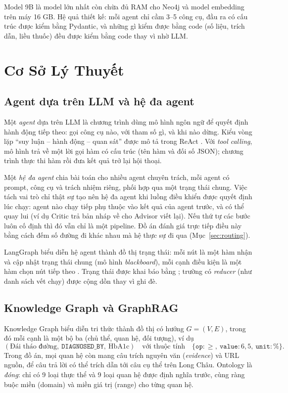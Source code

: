 \documentclass[12pt,a4paper]{report}
\newcommand{\codeinline}[1]{\texttt{\detokenize{#1}}}
\begin{document}
\noindent Model 9B là model lớn nhất còn chừa đủ RAM cho Neo4j và model embedding trên máy 16 GB.
Hệ quả thiết kế: mỗi agent chỉ cầm 3--5 công cụ, đầu ra có cấu trúc được kiểm bằng Pydantic, và
những gì kiểm được bằng code (số liệu, trích dẫn, liều thuốc) đều được kiểm bằng code thay vì nhờ LLM.

\chapter{Cơ Sở Lý Thuyết}

\section{Agent dựa trên LLM và hệ đa agent}
Một \emph{agent} dựa trên LLM là chương trình dùng mô hình ngôn ngữ để quyết định hành động
tiếp theo: gọi công cụ nào, với tham số gì, và khi nào dừng. Kiểu vòng lặp ``suy luận -- hành
động -- quan sát'' được mô tả trong ReAct \cite{react}. Với \emph{tool calling}, mô hình trả về
một lời gọi hàm có cấu trúc (tên hàm và đối số JSON); chương trình thực thi hàm rồi đưa kết quả
trở lại hội thoại.

Một \emph{hệ đa agent} chia bài toán cho nhiều agent chuyên trách, mỗi agent có prompt, công cụ
và trách nhiệm riêng, phối hợp qua một trạng thái chung. Việc tách vai trò chỉ thật sự tạo nên
hệ đa agent khi luồng điều khiển được quyết định lúc chạy: agent nào chạy tiếp phụ thuộc vào
kết quả của agent trước, và có thể quay lui (ví dụ Critic trả bản nháp về cho Advisor viết lại).
Nếu thứ tự các bước luôn cố định thì đó vẫn chỉ là một pipeline. Đồ án đánh giá trực tiếp điều
này bằng cách đếm số đường đi khác nhau mà hệ thực sự đi qua (Mục~\ref{sec:routing}).

LangGraph biểu diễn hệ agent thành đồ thị trạng thái: mỗi nút là một hàm nhận và cập nhật trạng
thái chung (mô hình \emph{blackboard}), mỗi cạnh điều kiện là một hàm chọn nút tiếp theo
\cite{langgraph}. Trạng thái được khai báo bằng \codeinline{TypedDict}; trường có \emph{reducer}
(như danh sách vết chạy) được cộng dồn thay vì ghi đè.

\section{Knowledge Graph và GraphRAG}
Knowledge Graph biểu diễn tri thức thành đồ thị có hướng $G=(V,E)$, trong đó mỗi cạnh là một
bộ ba (chủ thể, quan hệ, đối tượng), ví dụ
\begin{equation}
  (\text{Đái tháo đường},\ \texttt{DIAGNOSED\_BY},\ \text{HbA1c})
  \quad\text{với thuộc tính}\quad \{\texttt{op}: \geq,\ \texttt{value}: 6{,}5,\ \texttt{unit}: \%\}.
\end{equation}
Trong đồ án, mọi quan hệ còn mang câu trích nguyên văn (\emph{evidence}) và URL nguồn, để câu
trả lời có thể trích dẫn tới câu cụ thể trên Long Châu. Ontology là \emph{đóng}: chỉ có 9 loại
thực thể và 9 loại quan hệ được định nghĩa trước, cùng ràng buộc miền (domain) và miền giá trị
(range) cho từng quan hệ.
\end{document}
